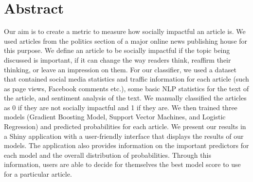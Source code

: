 \documentclass[10pt,letterpaper]{article}
\date{}
\newcommand{\getIndex}[2]{
  \ForEach{,}{\IfEq{#1}{\thislevelitem}{\number\thislevelcount\ExitForEach}{}}{#2}
}
\newcommand{\getAff}[1]{
  \getIndex{#1}{Smith College}
}
\begin{document}
\vspace*{0.2in}

\section*{Abstract}
Our aim is to create a metric to measure how socially impactful an
article is. We used articles from the politics section of a major online
news publishing house for this purpose. We define an article to be
socially impactful if the topic being discussed is important, if it can
change the way readers think, reaffirm their thinking, or leave an
impression on them. For our classifier, we used a dataset that contained
social media statistics and traffic information for each article (such
as page views, Facebook comments etc.), some basic NLP statistics for
the text of the article, and sentiment analysis of the text. We manually
classified the articles as 0 if they are not socially impactful and 1 if
they are. We then trained three models (Gradient Boosting Model, Support
Vector Machines, and Logistic Regression) and predicted probabilities
for each article. We present our results in a Shiny application with a
user-friendly interface that displays the results of our models. The
application also provides information on the important predictors for
each model and the overall distribution of probabilities. Through this
information, users are able to decide for themselves the best model
score to use for a particular article.

\end{document}
